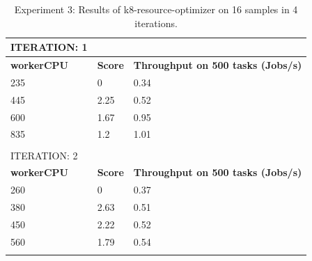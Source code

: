 \begin{table}[H]
\caption{Experiment 3: Results of k8-resource-optimizer on 16 samples in 4 iterations.}
\label{tbl:results2}
\centering
\begin{tabular}{lll}
ITERATION: 1                             &                                     &                                                  \\ \hline
\multicolumn{1}{|l|}{\textbf{workerCPU}} & \multicolumn{1}{l|}{\textbf{Score}} & \multicolumn{1}{l|}{\textbf{Throughput on 500 tasks (Jobs/s)}} \\ \hline
\multicolumn{1}{|l|}{235}                & \multicolumn{1}{l|}{0}              & \multicolumn{1}{l|}{0.34}                        \\ \hline
\multicolumn{1}{|l|}{445}                & \multicolumn{1}{l|}{2.25}           & \multicolumn{1}{l|}{0.52}                        \\ \hline
\multicolumn{1}{|l|}{600}                & \multicolumn{1}{l|}{1.67}           & \multicolumn{1}{l|}{0.95}                        \\ \hline
\multicolumn{1}{|l|}{835}                & \multicolumn{1}{l|}{1.2}            & \multicolumn{1}{l|}{1.01}                        \\ \hline
                                         &                                     &                                                  \\
ITERATION: 2                             &                                     &                                                  \\ \hline
\multicolumn{1}{|l|}{\textbf{workerCPU}} & \multicolumn{1}{l|}{\textbf{Score}} & \multicolumn{1}{l|}{\textbf{Throughput on 500 tasks (Jobs/s)}} \\ \hline
\multicolumn{1}{|l|}{260}                & \multicolumn{1}{l|}{0}              & \multicolumn{1}{l|}{0.37}                        \\ \hline
\multicolumn{1}{|l|}{380}                & \multicolumn{1}{l|}{2.63}           & \multicolumn{1}{l|}{0.51}                        \\ \hline
\multicolumn{1}{|l|}{450}                & \multicolumn{1}{l|}{2.22}           & \multicolumn{1}{l|}{0.52}                        \\ \hline
\multicolumn{1}{|l|}{560}                & \multicolumn{1}{l|}{1.79}           & \multicolumn{1}{l|}{0.54}                        \\ \hline
                                         &                                     &                                                  \\

\end{tabular}
\end{table}
